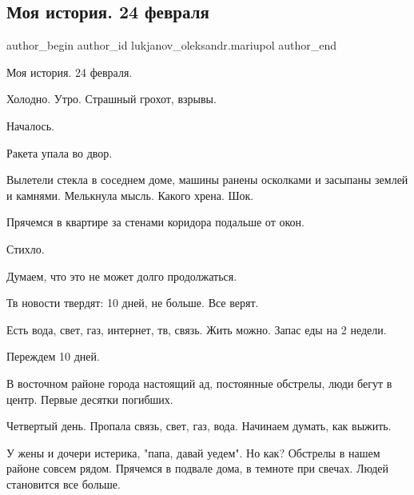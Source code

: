  
 
 
 
 

\subsection{Моя история. 24 февраля}
\label{sec:17_07_2022.fb.lukjanov_oleksandr.mariupol.1.moya_istoriya__24_fe}

\ifcmt
 author_begin
   author_id lukjanov_oleksandr.mariupol
 author_end
\fi

Моя история. 24 февраля.

Холодно. Утро. Страшный грохот, взрывы.

Началось.

Ракета упала во двор.

Вылетели стекла в соседнем доме, машины ранены осколками и засыпаны землей и
камнями. Мелькнула мысль. Какого хрена. Шок.

Прячемся в квартире за стенами коридора подальше от окон.

Стихло.

Думаем, что это не может долго продолжаться. 

Тв новости твердят: 10 дней, не больше. Все верят.

Есть вода, свет, газ, интернет, тв, связь. Жить можно. Запас еды на 2 недели.

Переждем 10 дней.

В восточном районе города настоящий ад, постоянные обстрелы, люди бегут в
центр. Первые десятки погибших.

Четвертый день. Пропала связь, свет, газ, вода. Начинаем думать, как выжить.

У жены и дочери истерика, "папа, давай уедем". Но как? Обстрелы в нашем районе
совсем рядом. Прячемся в подвале дома, в темноте при свечах. Людей становится
все больше.

